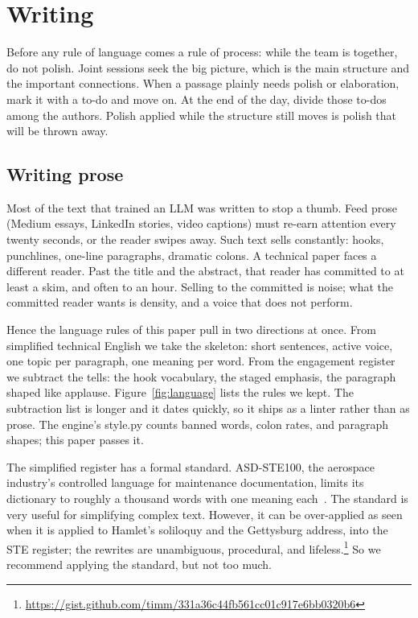 \section{Writing}
\label{sec:write}

Before any rule of language comes a rule of process: while the
team is together, do not polish.
Joint sessions seek the big picture, which is the main structure
and the important connections.
When a passage plainly needs polish or elaboration, mark it with a
to-do and move on.
At the end of the day, divide those to-dos among the authors.
Polish applied while the structure still moves is polish that
will be thrown away.

\subsection{Writing prose}

Most of the text that trained an LLM was written to stop a thumb.
Feed prose (Medium essays, LinkedIn stories, video captions) must
re-earn attention every twenty seconds, or the reader swipes away.
Such text sells constantly: hooks, punchlines, one-line paragraphs,
dramatic colons.
A technical paper faces a different reader.
Past the title and the abstract, that reader has committed to at
least a skim, and often to an hour.
Selling to the committed is noise; what the committed reader wants
is density, and a voice that does not perform.

Hence the language rules of this paper pull in two directions at
once.
From simplified technical English we take the skeleton: short
sentences, active voice, one topic per paragraph, one meaning per
word.
From the engagement register we subtract the tells: the hook
vocabulary, the staged emphasis, the paragraph shaped like
applause.
Figure~\ref{fig:language} lists the rules we kept.
The subtraction list is longer and it dates quickly, so it ships as
a linter rather than as prose.
The engine's {\ttfamily style.py} counts banned words, colon rates,
and paragraph shapes; this paper passes it.

The simplified register has a formal standard.
ASD-STE100, the aerospace industry's controlled language for
maintenance documentation, limits its dictionary to roughly a
thousand words with one meaning each~\cite{asdste25}.
The standard is very useful for simplifying complex
text. However, it can be over-applied
as seen when it is applied to
Hamlet's soliloquy and the Gettysburg address, into the STE
register; the rewrites are unambiguous, procedural, and
lifeless.\footnote{\url{https://gist.github.com/timm/331a36c44fb561cc01c917e6bb0320b6}}
So we recommend applying the standard, but not too much.

